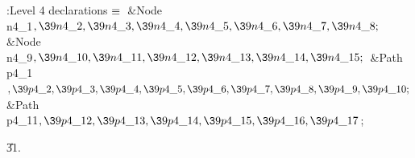 \B{}:Level 4 declarations\X${}\equiv{}$\6
\&{Node} \\{n4\_1}${},\39\\{n4\_2},\39\\{n4\_3},\39\\{n4\_4},\39\\{n4\_5},\39%
\\{n4\_6},\39\\{n4\_7},\39\\{n4\_8};{}$\6
\&{Node} \\{n4\_9}${},\39\\{n4\_10},\39\\{n4\_11},\39\\{n4\_12},\39\\{n4\_13},%
\39\\{n4\_14},\39\\{n4\_15};{}$\6
\&{Path} \\{p4\_1}${},\39\\{p4\_2},\39\\{p4\_3},\39\\{p4\_4},\39\\{p4\_5},\39%
\\{p4\_6},\39\\{p4\_7},\39\\{p4\_8},\39\\{p4\_9},\39\\{p4\_10};{}$\6
\&{Path} \\{p4\_11}${},\39\\{p4\_12},\39\\{p4\_13},\39\\{p4\_14},\39\\{p4\_15},%
\39\\{p4\_16},\39\\{p4\_17}{}$;\par
\U31.\fi

